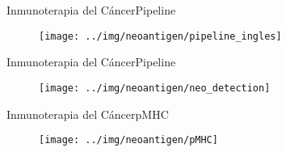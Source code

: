 \documentclass[10pt]{beamer}
\newcommand{\1}{
	\setbeamertemplate{background}{
		\texttt{[image: ../img/1]}
		\tikz[overlay] \fill[fill opacity=0.75,fill=white] (0,0) rectangle (-\paperwidth,\paperheight);
	}
}
\begin{document}
\begin{frame}{Inmunoterapia del Cáncer}{Pipeline}	
	\begin{figure}
		\texttt{[image: ../img/neoantigen/pipeline\_ingles]}
	\end{figure}		
\end{frame}

\begin{frame}{Inmunoterapia del Cáncer}{Pipeline}	
	\begin{figure}
		\texttt{[image: ../img/neoantigen/neo\_detection]}
	\end{figure}		
\end{frame}

\begin{frame}{Inmunoterapia del Cáncer}{pMHC}	
	\begin{figure}
		\texttt{[image: ../img/neoantigen/pMHC]}
	\end{figure}		
\end{frame}
\end{document}
